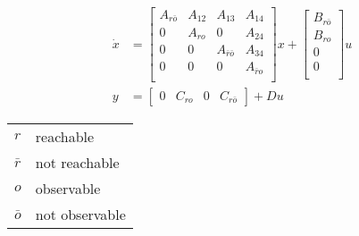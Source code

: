 \begin{align*}
    \dot{x} & = \begin{bmatrix}
                    A_{r\bar{o}} & A_{12} & A_{13}             & A_{14}       \\
                    0            & A_{ro} & 0                  & A_{24}       \\
                    0            & 0      & A_{\bar{r}\bar{o}} & A_{34}       \\
                    0            & 0      & 0                  & A_{\bar{r}o} \\
                \end{bmatrix}
    x + \begin{bmatrix}
            B_{r\bar{o}} \\
            B_{ro}       \\
            0            \\
            0            \\
        \end{bmatrix}
    u                                                                                                   \\
    y       & = \begin{bmatrix}
                    0 & C_{ro} & 0 & C_{r\bar{o}}
                \end{bmatrix}
    + Du
\end{align*}

\newpar{}

\begin{tabularx}{\linewidth}{@{}ll@{}}
    $r$       & reachable      \\
    $\bar{r}$ & not reachable  \\
    $o$       & observable     \\
    $\bar{o}$ & not observable \\
\end{tabularx}
